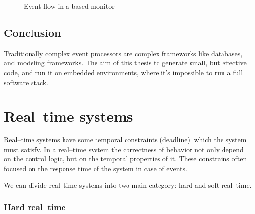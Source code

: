 \begin{figure}
	\centering
	\caption{Event flow in a \cep based monitor}
	\label{fig:cep_monitoring_event_flow}
\end{figure}

\subsection{Conclusion}

Traditionally complex event processors are complex frameworks like databases, and modeling frameworks. The aim of this thesis to generate small, but effective code, and run it on embedded environments, where it's impossible to run a full \cep software stack.

\section{Real--time systems}

Real--time systems have some temporal constraints (deadline), which the system must satisfy. In a real--time system the correctness of behavior not only depend on the control logic, but on the temporal properties of it. These constrains often focused on the response time of the system in case of events.

We can divide real--time systems into two main category: hard and soft real--time.

\subsubsection{Hard real--time}

